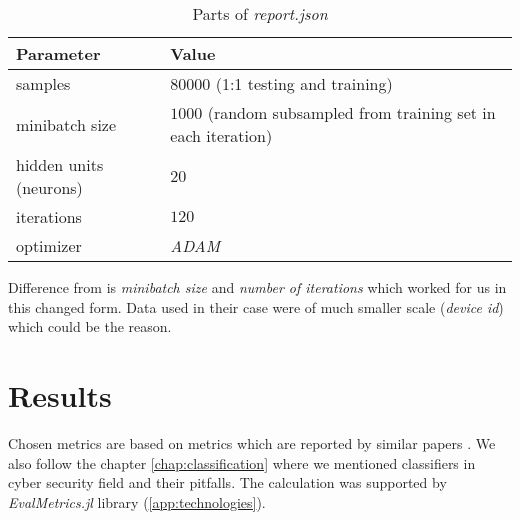 \begin{table}[h]
  \centering
  \caption{Parts of \emph{report.json}}
  \begin{tabular}{p{6cm}p{8cm}} 
      \toprule
      \textbf{Parameter} &
      \textbf{Value} \\
      \midrule
      samples & $80000$ (1:1 testing and training) \\
      \midrule
      minibatch size & $1000$ (random subsampled from training set in each iteration)\\
      \midrule
      hidden units (neurons)& $20$\\
      \midrule
      iterations & $120$\\
      \midrule
      optimizer & \emph{ADAM} \cite{Kingma2014}\\
      \bottomrule
  \end{tabular}
  \label{tab:hyperparams}
\end{table}


Difference from \cite{Mandlik2020} is \emph{minibatch size} and \emph{number of iterations} which worked for us in this changed form. Data used in their case were of much smaller scale (\emph{device id}) which could be the reason.

\section{Results}
Chosen metrics are based on metrics which are reported by similar papers . We also follow the chapter \ref{chap:classification} where we mentioned classifiers in cyber security field and their pitfalls. The calculation was supported by \emph{EvalMetrics.jl} library (\ref{app:technologies}).





